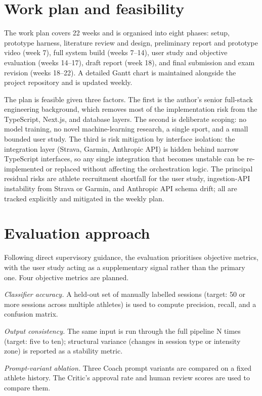 \section{Work plan and feasibility}

The work plan covers 22 weeks and is organised into eight phases: setup, prototype harness, literature review and design, preliminary report and prototype video (week 7), full system build (weeks 7--14), user study and objective evaluation (weeks 14--17), draft report (week 18), and final submission and exam revision (weeks 18--22). A detailed Gantt chart is maintained alongside the project repository and is updated weekly.

The plan is feasible given three factors. The first is the author's senior full-stack engineering background, which removes most of the implementation risk from the TypeScript, Next.js, and database layers. The second is deliberate scoping: no model training, no novel machine-learning research, a single sport, and a small bounded user study. The third is risk mitigation by interface isolation: the integration layer (Strava, Garmin, Anthropic API) is hidden behind narrow TypeScript interfaces, so any single integration that becomes unstable can be re-implemented or replaced without affecting the orchestration logic. The principal residual risks are athlete recruitment shortfall for the user study, ingestion-API instability from Strava or Garmin, and Anthropic API schema drift; all are tracked explicitly and mitigated in the weekly plan.

\section{Evaluation approach}

Following direct supervisory guidance, the evaluation prioritises objective metrics, with the user study acting as a supplementary signal rather than the primary one. Four objective metrics are planned.

\emph{Classifier accuracy.} A held-out set of manually labelled sessions (target: 50 or more sessions across multiple athletes) is used to compute precision, recall, and a confusion matrix.

\emph{Output consistency.} The same input is run through the full pipeline N times (target: five to ten); structural variance (changes in session type or intensity zone) is reported as a stability metric.

\emph{Prompt-variant ablation.} Three Coach prompt variants are compared on a fixed athlete history. The Critic's approval rate and human review scores are used to compare them.

